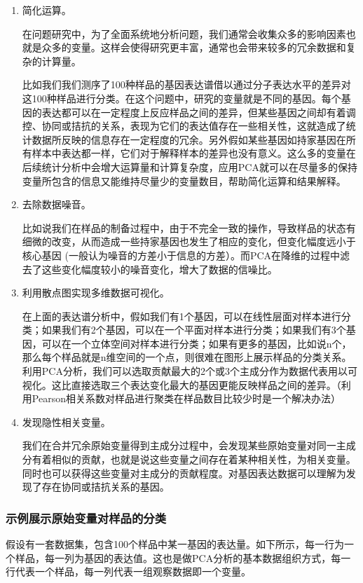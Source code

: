 \documentclass[]{article}
\numberwithin{figure}{section}
\numberwithin{table}{section}
\theoremstyle{definition}
\theoremstyle{definition}
\theoremstyle{definition}
\theoremstyle{remark}
\begin{document}
\begin{enumerate}
\def\labelenumi{\arabic{enumi}.}
\item
  简化运算。

  在问题研究中，为了全面系统地分析问题，我们通常会收集众多的影响因素也就是众多的变量。这样会使得研究更丰富，通常也会带来较多的冗余数据和复杂的计算量。

  比如我们我们测序了100种样品的基因表达谱借以通过分子表达水平的差异对这100种样品进行分类。在这个问题中，研究的变量就是不同的基因。每个基因的表达都可以在一定程度上反应样品之间的差异，但某些基因之间却有着调控、协同或拮抗的关系，表现为它们的表达值存在一些相关性，这就造成了统计数据所反映的信息存在一定程度的冗余。另外假如某些基因如持家基因在所有样本中表达都一样，它们对于解释样本的差异也没有意义。这么多的变量在后续统计分析中会增大运算量和计算复杂度，应用PCA就可以在尽量多的保持变量所包含的信息又能维持尽量少的变量数目，帮助简化运算和结果解释。
\item
  去除数据噪音。

  比如说我们在样品的制备过程中，由于不完全一致的操作，导致样品的状态有细微的改变，从而造成一些持家基因也发生了相应的变化，但变化幅度远小于核心基因
  (一般认为噪音的方差小于信息的方差）。而PCA在降维的过程中滤去了这些变化幅度较小的噪音变化，增大了数据的信噪比。
\item
  利用散点图实现多维数据可视化。

  在上面的表达谱分析中，假如我们有1个基因，可以在线性层面对样本进行分类；如果我们有2个基因，可以在一个平面对样本进行分类；如果我们有3个基因，可以在一个立体空间对样本进行分类；如果有更多的基因，比如说n个，那么每个样品就是n维空间的一个点，则很难在图形上展示样品的分类关系。利用PCA分析，我们可以选取贡献最大的2个或3个主成分作为数据代表用以可视化。这比直接选取三个表达变化最大的基因更能反映样品之间的差异。（利用Pearson相关系数对样品进行聚类在样品数目比较少时是一个解决办法）
\item
  发现隐性相关变量。

  我们在合并冗余原始变量得到主成分过程中，会发现某些原始变量对同一主成分有着相似的贡献，也就是说这些变量之间存在着某种相关性，为相关变量。同时也可以获得这些变量对主成分的贡献程度。对基因表达数据可以理解为发现了存在协同或拮抗关系的基因。
\end{enumerate}

\subsubsection{示例展示原始变量对样品的分类}

假设有一套数据集，包含100个样品中某一基因的表达量。如下所示，每一行为一个样品，每一列为基因的表达值。这也是做PCA分析的基本数据组织方式，每一行代表一个样品，每一列代表一组观察数据即一个变量。
\end{document}
